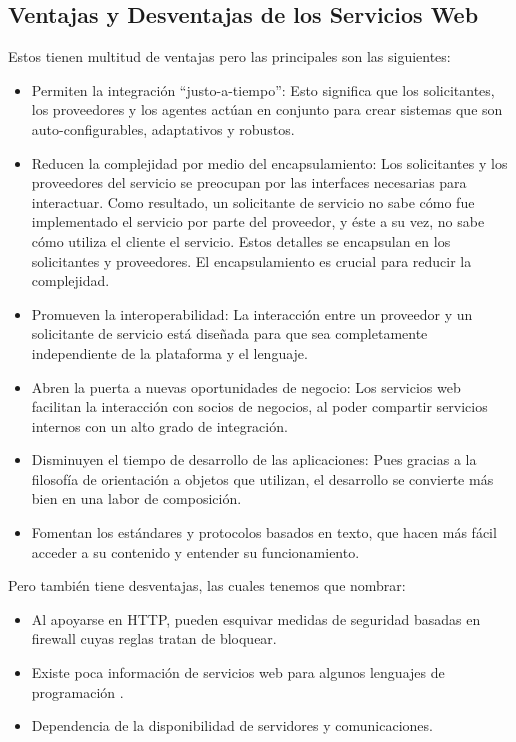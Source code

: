 \subsection{Ventajas y Desventajas de los  Servicios Web}
\label{cap:subsec:ventajasserviciosweb}
Estos tienen multitud de ventajas pero las principales son las siguientes:
\begin{itemize}
	 \item Permiten la integración “justo-a-tiempo”:  Esto significa que los solicitantes, los proveedores y los agentes actúan en conjunto para crear sistemas que son auto-configurables, adaptativos y robustos.
	\item Reducen la complejidad por medio del encapsulamiento: Los solicitantes y los proveedores del servicio se preocupan por las interfaces necesarias para interactuar. Como resultado, un solicitante de servicio no sabe cómo fue implementado el servicio por parte del proveedor, y éste a su vez, no sabe cómo utiliza el cliente el servicio. Estos detalles se encapsulan en los solicitantes y proveedores. El encapsulamiento es crucial para reducir la complejidad.
	\item Promueven la interoperabilidad: La interacción entre un proveedor y un solicitante de servicio está diseñada para que sea completamente independiente de la plataforma y el lenguaje. 
	\item Abren la puerta a nuevas oportunidades de negocio: Los servicios web facilitan la interacción con socios de negocios, al poder compartir servicios internos con un alto grado de integración.
	\item Disminuyen el tiempo de desarrollo de las aplicaciones: Pues gracias a la filosofía de orientación a objetos que utilizan, el desarrollo se convierte más bien en una labor de composición.
	\item Fomentan los estándares y protocolos basados en texto, que hacen más fácil acceder a su contenido y entender su funcionamiento.
\end{itemize}
Pero también tiene desventajas, las cuales tenemos que nombrar:
\begin{itemize}
	\item Al apoyarse en HTTP, pueden esquivar medidas de seguridad basadas en firewall cuyas reglas tratan de bloquear.
	\item Existe poca información de servicios web para algunos lenguajes de programación .
	\item Dependencia de la disponibilidad de servidores y comunicaciones.
\end{itemize}
